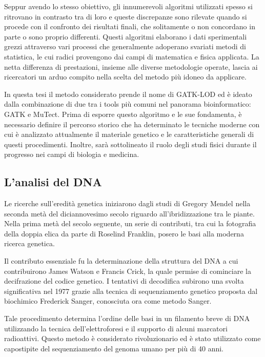 Seppur avendo lo stesso obiettivo, gli innumerevoli algoritmi utilizzati spesso si ritrovano in contrasto tra di loro e queste discrepanze sono rilevate quando si procede con il confronto dei risultati finali, che solitamente o non concordano in parte o sono proprio differenti.
Questi algoritmi elaborano i dati sperimentali grezzi attraverso vari processi che generalmente adoperano svariati metodi di statistica, le cui radici provengono dai campi di matematica e fisica applicata.
La netta differenza di prestazioni, insieme alle diverse metodologie operate, lascia ai ricercatori un arduo compito nella scelta del metodo più idoneo da applicare.

In questa tesi il metodo considerato prende il nome di GATK-LOD ed è ideato dalla combinazione di due tra i tools più comuni nel panorama bioinformatico: GATK e MuTect.
Prima di esporre questo algoritmo e le sue fondamenta, è necessario definire il percorso storico che ha determinato le tecniche moderne con cui è analizzato attualmente il materiale genetico e le caratteristiche generali di questi procedimenti.
Inoltre, sarà sottolineato il ruolo degli studi fisici durante il progresso nei campi di biologia e medicina.

\subsection{L'analisi del DNA}
Le ricerche sull'eredità genetica iniziarono dagli studi di Gregory Mendel nella seconda metà del diciannovesimo secolo riguardo all'ibridizzazione tra le piante. 
Nella prima metà del secolo seguente, un serie di contributi, tra cui la fotografia della doppia elica da parte di Roselind Franklin, posero le basi alla moderna ricerca genetica.

Il contributo essenziale fu la determinazione della struttura del DNA a cui contribuirono James Watson e Francis Crick, la quale permise di cominciare la decifrazione del codice genetico.
I tentativi di decodifica subirono una svolta significativa nel 
1977 grazie alla tecnica di sequenziamento genetico proposta dal biochimico Frederick Sanger, conosciuta ora come metodo Sanger.

Tale procedimento determina l'ordine delle basi in un filamento breve di DNA utilizzando la tecnica dell'elettroforesi e il supporto di alcuni marcatori radioattivi.
Questo metodo è considerato rivoluzionario ed è stato utilizzato come capostipite del sequenziamento del genoma umano per più di 40 anni.

